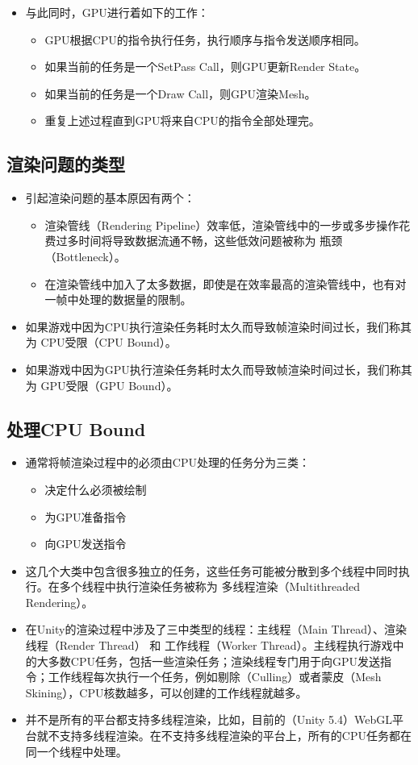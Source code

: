 \documentclass[9pt, b5paper]{article}
\begin{document}
\begin{itemize}
\begin{itemize}
\end{itemize}
\item 与此同时，GPU进行着如下的工作：
\begin{itemize}
\item GPU根据CPU的指令执行任务，执行顺序与指令发送顺序相同。
\item 如果当前的任务是一个SetPass Call，则GPU更新Render State。
\item 如果当前的任务是一个Draw Call，则GPU渲染Mesh。
\item 重复上述过程直到GPU将来自CPU的指令全部处理完。
\end{itemize}
\end{itemize}
\subsection{渲染问题的类型}
\label{sec-6-2}
\begin{itemize}
\item 引起渲染问题的基本原因有两个：
\begin{itemize}
\item 渲染管线（Rendering Pipeline）效率低，渲染管线中的一步或多步操作花费过多时间将导致数据流通不畅，这些低效问题被称为 瓶颈（Bottleneck）。
\item 在渲染管线中加入了太多数据，即使是在效率最高的渲染管线中，也有对一帧中处理的数据量的限制。
\end{itemize}
\item 如果游戏中因为CPU执行渲染任务耗时太久而导致帧渲染时间过长，我们称其为 CPU受限（CPU Bound）。
\item 如果游戏中因为GPU执行渲染任务耗时太久而导致帧渲染时间过长，我们称其为 GPU受限（GPU Bound）。
\end{itemize}
\subsection{处理CPU Bound}
\label{sec-6-3}
\begin{itemize}
\item 通常将帧渲染过程中的必须由CPU处理的任务分为三类：
\begin{itemize}
\item 决定什么必须被绘制
\item 为GPU准备指令
\item 向GPU发送指令
\end{itemize}
\item 这几个大类中包含很多独立的任务，这些任务可能被分散到多个线程中同时执行。在多个线程中执行渲染任务被称为 多线程渲染（Multithreaded Rendering）。
\item 在Unity的渲染过程中涉及了三中类型的线程：主线程（Main Thread）、渲染线程（Render Thread） 和 工作线程（Worker Thread）。主线程执行游戏中的大多数CPU任务，包括一些渲染任务；渲染线程专门用于向GPU发送指令；工作线程每次执行一个任务，例如剔除（Culling）或者蒙皮（Mesh Skining），CPU核数越多，可以创建的工作线程就越多。
\item 并不是所有的平台都支持多线程渲染，比如，目前的（Unity 5.4）WebGL平台就不支持多线程渲染。在不支持多线程渲染的平台上，所有的CPU任务都在同一个线程中处理。
\end{itemize}
\end{document}
